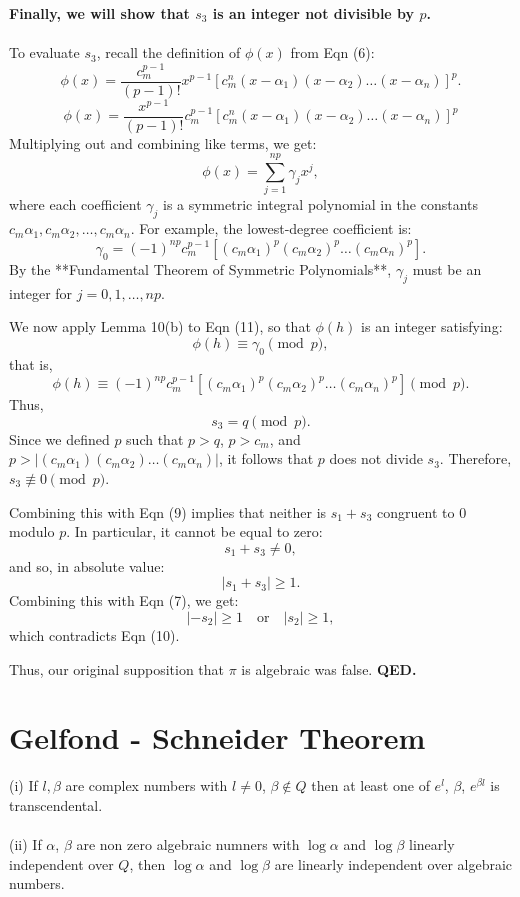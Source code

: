 \documentclass{article}
\begin{document}
\textbf{Finally, we will show that $s_3$ is an integer not divisible by $p$.}\\\\
To evaluate $s_3$, recall the definition of $\phi(x)$ from Eqn (6):
\[
\phi(x) = \frac{c_m^{p-1}}{(p-1)!} x^{p-1} \left[ c_m^n (x - \alpha_1)(x - \alpha_2) \dots (x - \alpha_n) \right]^p.
\]
\[ \phi(x) = \frac{x^{p-1}}{(p-1)!} c_m^{p-1} [c_m^n (x - \alpha_1)(x - \alpha_2) \dots (x - \alpha_n)]^p \]
Multiplying out and combining like terms, we get:
\[
\phi(x) = \sum_{j=1}^{np} \gamma_j x^j,
\]
where each coefficient $\gamma_j$ is a symmetric integral polynomial in the constants $c_m \alpha_1, c_m \alpha_2, \dots, c_m \alpha_n$. For example, the lowest-degree coefficient is:
\[
\gamma_0 = (-1)^{np} c_m^{p-1} \left[ (c_m \alpha_1)^p (c_m \alpha_2)^p \dots (c_m \alpha_n)^p \right].
\]
By the **Fundamental Theorem of Symmetric Polynomials**, $\gamma_j$ must be an integer for $j = 0, 1, \dots, np$. 

We now apply Lemma 10(b) to Eqn (11), so that $\phi(h)$ is an integer satisfying:
\[
\phi(h) \equiv \gamma_0 \pmod{p},
\]
that is,
\[
\phi(h) \equiv (-1)^{np} c_m^{p-1} \left[ (c_m \alpha_1)^p (c_m \alpha_2)^p \dots (c_m \alpha_n)^p \right] \pmod{p}.
\]
Thus, 
\[
s_3 = q \pmod{p}.
\]
Since we defined $p$ such that $p > q$, $p > c_m$, and $p > |(c_m \alpha_1)(c_m \alpha_2) \dots (c_m \alpha_n)|$, it follows that $p$ does not divide $s_3$. Therefore, $s_3 \not\equiv 0 \pmod{p}$.

Combining this with Eqn (9) implies that neither is $s_1 + s_3$ congruent to 0 modulo $p$. In particular, it cannot be equal to zero:
\[
s_1 + s_3 \neq 0,
\]
and so, in absolute value:
\[
|s_1 + s_3| \geq 1.
\]
Combining this with Eqn (7), we get:
\[
|-s_2| \geq 1 \quad \text{or} \quad |s_2| \geq 1,
\]
which contradicts Eqn (10). 

Thus, our original supposition that $\pi$ is algebraic was false. \textbf{QED.}


\section{Gelfond - Schneider Theorem}


(i) If $l, \beta$ are complex numbers with $l \neq 0$, $\beta \not\in Q$ then at least one of 
$e^{l}$, $\beta$, $e^{\beta l}$ is transcendental.\\\\
(ii) If $\alpha$, $\beta$ are non zero algebraic numners with $\log \alpha$ and 
$\log \beta$ linearly independent over $Q$, then $\log \alpha$ and $\log \beta$ are 
linearly independent over algebraic numbers.\\\\
\end{document}
